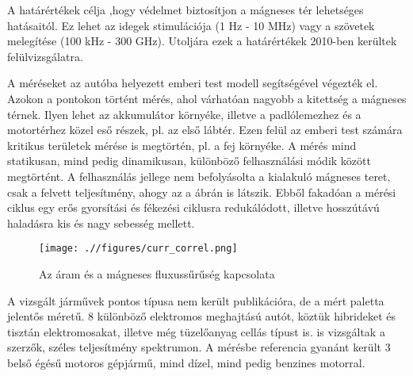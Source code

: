 A határértékek célja ,hogy védelmet biztosítjon a mágneses tér lehetséges hatásaitól. Ez lehet az idegek stimulációja (1 Hz - 10 MHz) vagy a szövetek melegítése (100 kHz - 300 GHz). Utoljára ezek a határértékek 2010-ben kerültek felülvizsgálatra.

A méréseket az autóba helyezett emberi test modell segítségével végezték el. Azokon a pontokon történt mérés, ahol várhatóan nagyobb a kitettség a mágneses térnek. Ilyen lehet az akkumulátor környéke, illetve a padlólemezhez és a motortérhez közel eső részek, pl. az első lábtér. Ezen felül az emberi test számára kritikus területek mérése is megtörtén, pl. a fej környéke. A mérés mind statikusan, mind pedig dinamikusan, különböző felhasználási módik között megtörtént. A felhasználás jellege nem befolyásolta a kialakuló mágneses teret, csak a felvett teljesítmény, ahogy az a  ábrán is látszik. Ebből fakadóan a mérési ciklus egy erős gyorsítási és fékezési ciklusra redukálódott, illetve hosszútávú haladásra kis és nagy sebesség mellett.

\begin{figure}[h]
 \centerline{\texttt{[image: .//figures/curr\_correl.png]}}
 \caption{Az áram és a mágneses fluxussűrűség kapcsolata}
 \label{fig:curr_correlation}
\end{figure}

A vizsgált járművek pontos típusa nem került publikációra, de a mért paletta jelentős méretű. 8 különböző elektromos meghajtású autót, köztük hibrideket és tisztán elektromosakat, illetve még tüzelőanyag cellás típust is. is vizsgáltak a szerzők, széles teljesítmény spektrumon. A mérésbe referencia gyanánt került 3 belső égésű motoros gépjármű, mind dízel, mind pedig benzines motorral.



